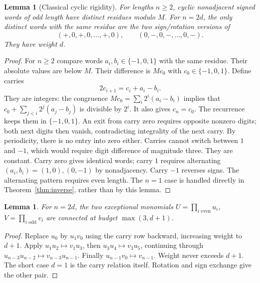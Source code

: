 \documentclass[11pt]{article}
\newtheorem{lemma}[theorem]{Lemma}
\theoremstyle{remark}\newtheorem{remark}[theorem]{Remark}
\begin{document}
\begin{lemma}[Classical cyclic rigidity]\label{lem:rigidity}
For lengths $n\ge2$, cyclic nonadjacent signed words of odd length have distinct residues modulo
$M$. For $n=2d$, the only distinct words with the same residue are the two
sign/rotation versions of
\[
      (+,0,+,0,\ldots,+,0),\qquad
      (0,-,0,-,\ldots,0,-).
\]
They have weight $d$.
\end{lemma}
\begin{proof}
For $n\ge2$ compare words $a_i,b_i\in\{-1,0,1\}$ with the same residue.
Their absolute values are below $M$. Their difference is $Mc_0$ with
$c_0\in\{-1,0,1\}$. Define carries
\[
                    2c_{i+1}=c_i+a_i-b_i.
\]
They are integers: the congruence $Mc_0=\sum_i2^i(a_i-b_i)$ implies
that $c_0+\sum_{j<i}2^j(a_j-b_j)$ is divisible by $2^i$.
It also gives $c_n=c_0$. The recurrence keeps them in $\{-1,0,1\}$.
An exit from carry zero requires opposite nonzero digits; both next digits
then vanish, contradicting integrality of the next carry. By periodicity,
there is no entry into zero either. Carries cannot switch between $1$ and
$-1$, which would require digit difference of magnitude three. They are
constant. Carry zero gives identical words; carry $1$ requires alternating
$(a_i,b_i)=(1,0),(0,-1)$ by nonadjacency. Carry $-1$ reverses signs.
The alternating pattern requires even length. The $n=1$ case is handled
directly in Theorem~\ref{thm:inverse}, rather than by this lemma.
\end{proof}

\begin{lemma}\label{lem:bridge}
For $n=2d$, the two exceptional monomials
$U=\prod_{i\text{ even}}u_i$, $V=\prod_{i\text{ odd}}v_i$
are connected at budget $\max(3,d+1)$.
\end{lemma}
\begin{proof}
Replace $u_0$ by $u_1v_0$ using the carry row backward, increasing weight
to $d+1$. Apply $u_1u_2\mapsto v_1u_3$, then
$u_3u_4\mapsto v_3u_5$, continuing through
$u_{n-3}u_{n-2}\mapsto v_{n-3}u_{n-1}$.
Finally $u_{n-1}v_0\mapsto v_{n-1}$. Weight never exceeds $d+1$.
The short case $d=1$ is the carry relation itself. Rotation and sign
exchange give the other pair.
\end{proof}
\end{document}
